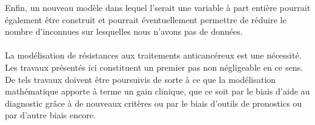 \documentclass[main.tex]{subfiles}
\begin{document}
Enfin, un nouveau modèle dans lequel l'\hetero serait une variable à part entière pourrait également être construit et pourrait éventuellement permettre de réduire le nombre d'inconnues sur lesquelles nous n'avons pas de données.

\paragraph{}
La modélisation de résistances aux traitements anticancéreux est une nécessité. Les travaux présentés ici constituent un premier pas non négligeable en ce sens. 
De tels travaux doivent être poursuivis de sorte à ce que la modélisation mathématique apporte à terme un gain clinique, que ce soit par le biais d'aide au diagnostic grâce à de nouveaux critères ou par le biais d'outils de pronostics ou par d'autre biais encore.
\end{document}
